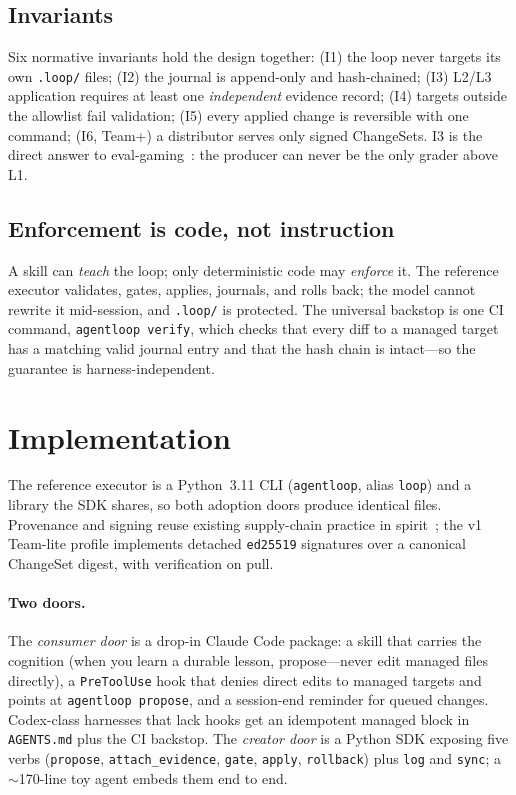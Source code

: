 \documentclass[10pt,twocolumn]{article}
\begin{document}
\subsection{Invariants}
Six normative invariants hold the design together: (I1) the loop never
targets its own \texttt{.loop/} files; (I2) the journal is append-only and
hash-chained; (I3) L2/L3 application requires at least one
\emph{independent} evidence record; (I4) targets outside the allowlist
fail validation; (I5) every applied change is reversible with one command;
(I6, Team+) a distributor serves only signed ChangeSets. I3 is the direct
answer to eval-gaming~\cite{dgm}: the producer can never be the only
grader above L1.

\subsection{Enforcement is code, not instruction}
A skill can \emph{teach} the loop; only deterministic code may
\emph{enforce} it. The reference executor validates, gates, applies,
journals, and rolls back; the model cannot rewrite it mid-session, and
\texttt{.loop/} is protected. The universal backstop is one CI command,
\texttt{agentloop verify}, which checks that every diff to a managed target
has a matching valid journal entry and that the hash chain is intact---so
the guarantee is harness-independent.

\section{Implementation}
\label{sec:impl}
The reference executor is a Python~3.11 CLI (\texttt{agentloop}, alias
\texttt{loop}) and a library the SDK shares, so both adoption doors produce
identical files. Provenance and signing reuse existing supply-chain
practice in spirit~\cite{intoto,slsa,sigstore}; the v1 Team-lite profile
implements detached \texttt{ed25519} signatures over a canonical
ChangeSet digest, with verification on pull.

\paragraph{Two doors.} The \emph{consumer door} is a drop-in Claude Code
package: a skill that carries the cognition (when you learn a durable
lesson, propose---never edit managed files directly), a \texttt{PreToolUse}
hook that denies direct edits to managed targets and points at
\texttt{agentloop propose}, and a session-end reminder for queued changes.
Codex-class harnesses that lack hooks get an idempotent managed block in
\texttt{AGENTS.md} plus the CI backstop. The \emph{creator door} is a
Python SDK exposing five verbs (\texttt{propose}, \texttt{attach\_evidence},
\texttt{gate}, \texttt{apply}, \texttt{rollback}) plus \texttt{log} and
\texttt{sync}; a $\sim$170-line toy agent embeds them end to end.
\end{document}

